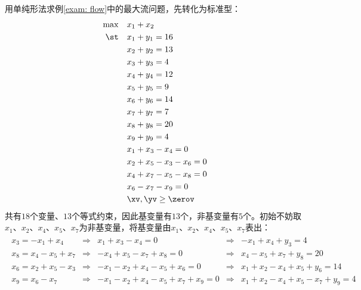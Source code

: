 \documentclass{ctexart}
\begin{document}
\begin{example}
    用单纯形法求例\ref{exam: flow}中的最大流问题，先转化为标准型：
    \begin{align*}
        \max \quad & x_1 + x_2                 \\
        \st \quad  & x_1 + y_1 = 16            \\
                   & x_2 + y_2 =  13           \\
                   & x_3 + y_3 =  4            \\
                   & x_4 + y_4 =  12           \\
                   & x_5 + y_5 =  9            \\
                   & x_6 + y_6 =  14           \\
                   & x_7 + y_7 =  7            \\
                   & x_8 + y_8 =  20           \\
                   & x_9 + y_9 =  4            \\
                   & x_1 + x_3 - x_4 = 0       \\
                   & x_2 + x_5 - x_3 - x_6 = 0 \\
                   & x_4 + x_7 - x_5 - x_8 = 0 \\
                   & x_6 - x_7 - x_9 = 0       \\
                   & \xv, \yv \ge \zerov
    \end{align*}
    共有$18$个变量、$13$个等式约束，因此基变量有$13$个，非基变量有$5$个。初始不妨取$x_1$、$x_2$、$x_4$、$x_5$、$x_7$为非基变量，将基变量由$x_1$、$x_2$、$x_4$、$x_5$、$x_7$表出：
    \begin{align*}
        \begin{array}{rclcl}
            x_3 = -x_1 + x_4      & \Rightarrow & x_1 + x_3 - x_4 = 0                    & \Rightarrow & -x_1 + x_4 + y_3 = 4                  \\
            x_8 = x_4 - x_5 + x_7 & \Rightarrow & -x_4 + x_5 - x_7 + x_8 = 0             & \Rightarrow & x_4 - x_5 + x_7 + y_8 = 20            \\
            x_6 = x_2 + x_5 - x_3 & \Rightarrow & -x_1 - x_2 + x_4 - x_5 + x_6 = 0       & \Rightarrow & x_1 + x_2 - x_4 + x_5 + y_6 = 14      \\
            x_9 = x_6 - x_7       & \Rightarrow & -x_1 - x_2 + x_4 - x_5 + x_7 + x_9 = 0 & \Rightarrow & x_1 + x_2 - x_4 + x_5 - x_7 + y_9 = 4 \\
        \end{array}
    \end{align*}


\end{example}
\end{document}
